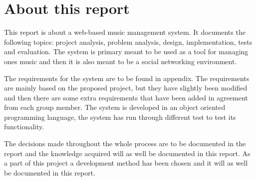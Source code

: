 \section{About this report}
This report is about a web-based music management system. It documents the 
following topics: project analysis, problem analysis, design, implementation, 
tests and evaluation. 
The system is primary meant to be used as a tool for 
managing ones music and then it is also meant to be a social networking 
environment.

The requirements for the system are to be found in appendix. The requirements 
are mainly based on the proposed project, but they have slightly been modified 
and then there are some extra requirements that have been added in agreement 
from each group member. 
The system is developed in an object oriented programming language, 
the system has run through different test to test its functionality.

The decisions made throughout the whole process are to be documented in the 
report and the knowledge acquired will as well be documented in this report. 
As a part of this project a development method has been chosen and it will as 
well be documented in this report.
